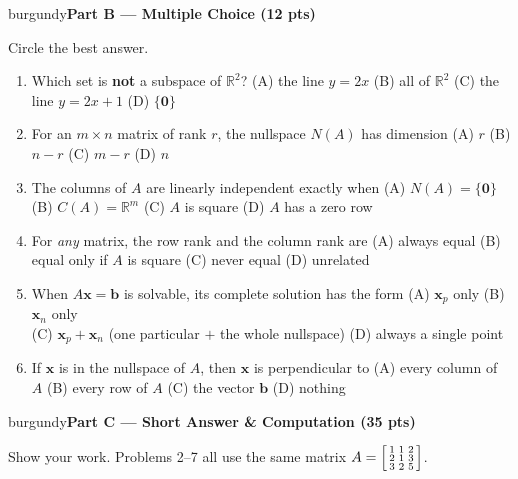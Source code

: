 \documentclass[10pt]{article}
\newcommand{\bb}{\mathbf{b}}
\newcommand{\xx}{\mathbf{x}}
\newcommand{\zero}{\mathbf{0}}
\newcommand{\parthead}[1]{%
  \vspace{6pt}\noindent
  \begin{headlinebox}{burgundy}{\color{white}\bfseries #1}\end{headlinebox}%
  \vspace{4pt}}
\begin{document}
\parthead{Part B --- Multiple Choice (12 pts)}
Circle the best answer.

\begin{enumerate}[leftmargin=1.9em, itemsep=9pt]
  \item Which set is \textbf{not} a subspace of $\mathbb{R}^2$?
    \hfill (A) the line $y=2x$ \quad (B) all of $\mathbb{R}^2$ \quad (C) the line $y=2x+1$ \quad (D) $\{\zero\}$
  \item For an $m\times n$ matrix of rank $r$, the nullspace $N(A)$ has dimension
    \hfill (A) $r$ \quad (B) $n-r$ \quad (C) $m-r$ \quad (D) $n$
  \item The columns of $A$ are linearly independent exactly when
    \hfill (A) $N(A)=\{\zero\}$ \quad (B) $C(A)=\mathbb{R}^m$ \quad (C) $A$ is square \quad (D) $A$ has a zero row
  \item For \emph{any} matrix, the row rank and the column rank are
    \hfill (A) always equal \quad (B) equal only if $A$ is square \quad (C) never equal \quad (D) unrelated
  \item When $A\xx=\bb$ is solvable, its complete solution has the form
    \hfill (A) $\xx_p$ only \quad (B) $\xx_n$ only \\
    \phantom{x}\hfill (C) $\xx_p+\xx_n$ (one particular $+$ the whole nullspace) \quad (D) always a single point
  \item If $\xx$ is in the nullspace of $A$, then $\xx$ is perpendicular to
    \hfill (A) every column of $A$ \quad (B) every row of $A$ \quad (C) the vector $\bb$ \quad (D) nothing
\end{enumerate}

\parthead{Part C --- Short Answer \& Computation (35 pts)}
Show your work. Problems 2--7 all use the same matrix
$A=\begin{bsmallmatrix}1&1&2\\2&1&3\\3&2&5\end{bsmallmatrix}$.
\end{document}
